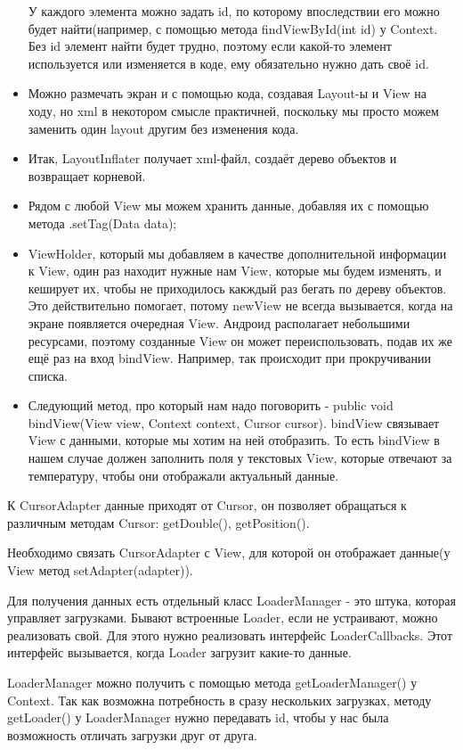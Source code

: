 \documentclass[12 pt]{article}
\begin{document}
\begin{itemize}
        У каждого элемента можно задать id, по которому впоследствии его можно будет найти(например, с помощью метода findViewById(int id) у Context. Без id элемент найти будет трудно, поэтому если какой-то элемент используется или изменяется в коде, ему обязательно нужно дать своё id.
        \item Можно размечать экран и с помощью кода, создавая Layout-ы и View на ходу, но xml в некотором смысле практичней, поскольку мы просто можем заменить один layout другим без изменения кода.
        \item Итак, LayoutInflater получает xml-файл, создаёт дерево объектов и возвращает корневой.
        \item Рядом с любой View мы можем хранить данные, добавляя их с помощью метода .setTag(Data data);
        \item ViewHolder, который мы добавляем в качестве дополнительной информации к View, один раз находит нужные нам View, которые мы будем изменять, и кеширует их, чтобы не приходилось какждый раз бегать по дереву объектов. Это действительно помогает, потому newView не всегда вызывается, когда на экране появляется очередная View. Андроид располагает небольшими ресурсами, поэтому созданные View он может переиспользовать, подав их же ещё раз на вход bindView. Например, так происходит при прокручивании списка.
        \item Следующий метод, про который нам надо поговорить - public void bindView(View view, Context context, Cursor cursor). bindView связывает View с данными, которые мы хотим на ней отобразить. То есть bindView в нашем случае должен заполнить поля у текстовых View, которые отвечают за температуру, чтобы они отображали актуальный данные.
    \end{itemize}
    
    К CursorAdapter данные приходят от Cursor, он позволяет обращаться к различным методам Cursor: getDouble(), getPosition().
	
	Необходимо связать CursorAdapter с View, для которой он отображает данные(у View метод setAdapter(adapter)).
    
    Для получения данных есть отдельный класс LoaderManager - это штука, которая управляет загрузками. Бывают встроенные Loader, если не устраивают, можно реализовать свой. Для этого нужно реализовать интерфейс LoaderCallbacks. Этот интерфейс вызывается, когда Loader загрузит какие-то данные.
	
    LoaderManager можно получить с помощью метода getLoaderManager() у Context. Так как возможна потребность в сразу нескольких загрузках, методу getLoader() у LoaderManager нужно передавать id, чтобы у нас была возможность отличать загрузки друг от друга.
    
\end{document}
